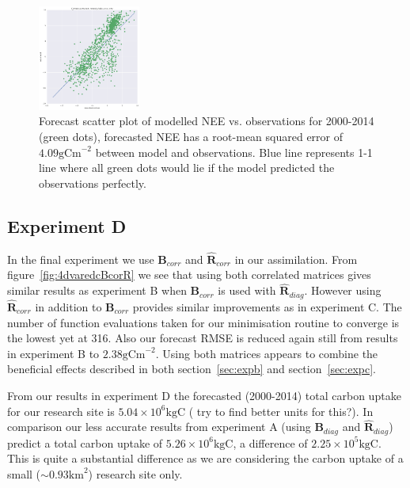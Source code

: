 \documentclass[11pt]{article}
\begin{document}
\begin{figure}[ht]
    \centering
    \includegraphics[width=0.3\textwidth]{bdiagr_corr_cor03_tau4_cutoff4_var05_forecast_scatter.png}
    \caption{Forecast scatter plot of modelled NEE vs. observations for 2000-2014 (green dots), forecasted NEE has a root-mean squared error of $4.09 \text{gCm}^{-2}$ between model and observations. Blue line represents 1-1 line where all green dots would lie if the model predicted the observations perfectly.}
    \label{fig:forecastscatBR}
\end{figure}

\subsection{Experiment D}

In the final experiment we use $\textbf{B}_{corr}$ and $\hat{\textbf{R}}_{corr}$ in our assimilation. From figure~\ref{fig:4dvaredcBcorR} we see that using both correlated matrices gives similar results as experiment B when $\textbf{B}_{corr}$ is used with $\hat{\textbf{R}}_{diag}$. However using $\hat{\textbf{R}}_{corr}$ in addition to $\textbf{B}_{corr}$ provides similar improvements as in experiment C. The number of function evaluations taken for our minimisation routine to converge is the lowest yet at 316. Also our forecast RMSE is reduced again still from results in experiment B to $2.38 \text{gCm}^{-2}$. Using both matrices appears to combine the beneficial effects described in both section~\ref{sec:expb} and section~\ref{sec:expc}.
 
From our results in experiment D the forecasted (2000-2014) total carbon uptake for our research site is $5.04\times 10^6 \text{kgC}$ ({\color{red} try to find better units for this?}). In comparison our less accurate results from experiment A (using $\textbf{B}_{diag}$ and $\hat{\textbf{R}}_{diag}$) predict a total carbon uptake of $5.26 \times 10^6\text{kgC}$, a difference of $2.25 \times 10^5\text{kgC}$. This is quite a substantial difference as we are considering the carbon uptake of a small ($\sim 0.93\text{km}^2$) research site only.
\end{document}
